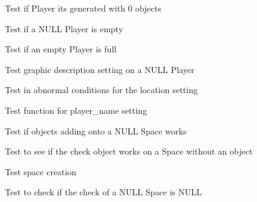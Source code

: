 \begin{DoxyRefList}
\item[\label{test__test000184}%
\hypertarget{test__test000184}{}%
Member \hyperlink{player__test_8h_a718933fd0429cdc840c6624882550d3b}{test2\+\_\+player\+\_\+get\+\_\+objects\+\_\+number} ()]Test if Player its generated with 0 objects  
\item[\label{test__test000195}%
\hypertarget{test__test000195}{}%
Member \hyperlink{player__test_8h_ab101e35e3034e348688b0a8ffd81f8ad}{test2\+\_\+player\+\_\+is\+\_\+empty} ()]Test if a N\+U\+LL Player is empty  
\item[\label{test__test000198}%
\hypertarget{test__test000198}{}%
Member \hyperlink{player__test_8h_a2a0781d2fbfb7f0d8870b7501db230a6}{test2\+\_\+player\+\_\+is\+\_\+full} ()]Test if an empty Player is full  
\item[\label{test__test000170}%
\hypertarget{test__test000170}{}%
Member \hyperlink{player__test_8h_a4d18de1dc3a06db35a47aaa2c81df4fd}{test2\+\_\+player\+\_\+set\+\_\+graphic\+\_\+description} ()]Test graphic description setting on a N\+U\+LL Player  
\item[\label{test__test000173}%
\hypertarget{test__test000173}{}%
Member \hyperlink{player__test_8h_a2c702753d9e2e3df9ef4abf2d1b9bc8d}{test2\+\_\+player\+\_\+set\+\_\+location} ()]Test in abnormal conditions for the location setting  
\item[\label{test__test000167}%
\hypertarget{test__test000167}{}%
Member \hyperlink{player__test_8h_a6e7ce8ff791f4bf63749df647a44263f}{test2\+\_\+player\+\_\+set\+\_\+name} ()]Test function for player\+\_\+name setting  
\item[\label{test__test000246}%
\hypertarget{test__test000246}{}%
Member \hyperlink{space__test_8h_af5de291847d272d79a524c30b96f6f0c}{test2\+\_\+space\+\_\+add\+\_\+object} ()]Test if objects adding onto a N\+U\+LL Space works  
\item[\label{test__test000255}%
\hypertarget{test__test000255}{}%
Member \hyperlink{space__test_8h_a38e4abfa3cee772d0c0ecedb73ee98c1}{test2\+\_\+space\+\_\+check\+\_\+object} ()]Test to see if the check object works on a Space without an object  
\item[\label{test__test000205}%
\hypertarget{test__test000205}{}%
Member \hyperlink{space__test_8h_a012cd3cf37a8d91e2d7098a264c29d65}{test2\+\_\+space\+\_\+create} ()]Test space creation  
\item[\label{test__test000238}%
\hypertarget{test__test000238}{}%
Member \hyperlink{space__test_8h_ae1e71883c15a97ec2b6d16ddbf77f301}{test2\+\_\+space\+\_\+get\+\_\+check} ()]Test to check if the check of a N\+U\+LL Space is N\+U\+LL  

\end{DoxyRefList}
